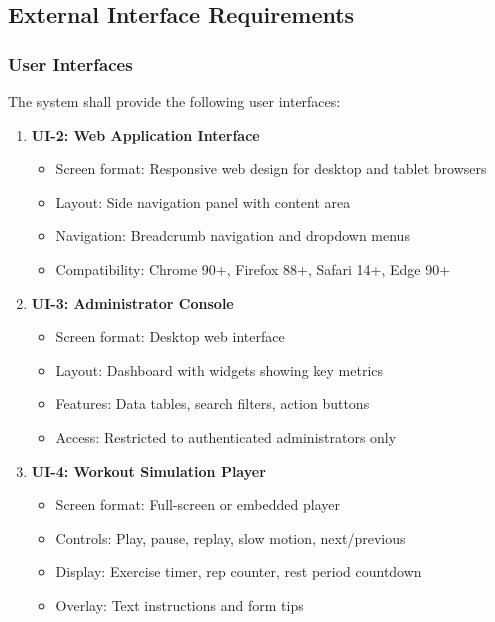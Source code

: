 \documentclass[12pt,a4paper]{article}
\begin{document}
\subsection{External Interface Requirements}

\subsubsection{User Interfaces}
The system shall provide the following user interfaces:

\begin{enumerate}
    
    \item \textbf{UI-2: Web Application Interface}
    \begin{itemize}
        \item Screen format: Responsive web design for desktop and tablet browsers
        \item Layout: Side navigation panel with content area
        \item Navigation: Breadcrumb navigation and dropdown menus
        \item Compatibility: Chrome 90+, Firefox 88+, Safari 14+, Edge 90+
    \end{itemize}
    
    \item \textbf{UI-3: Administrator Console}
    \begin{itemize}
        \item Screen format: Desktop web interface
        \item Layout: Dashboard with widgets showing key metrics
        \item Features: Data tables, search filters, action buttons
        \item Access: Restricted to authenticated administrators only
    \end{itemize}
    
    \item \textbf{UI-4: Workout Simulation Player}
    \begin{itemize}
        \item Screen format: Full-screen or embedded player
        \item Controls: Play, pause, replay, slow motion, next/previous
        \item Display: Exercise timer, rep counter, rest period countdown
        \item Overlay: Text instructions and form tips
    \end{itemize}
\end{enumerate}
\end{document}
